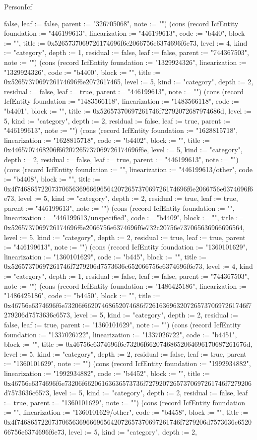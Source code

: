 \begin{lexlean}{PersonIcf}
\begin{semanticmodule}
{false, leaf := false, parent := "326705068", note := ""}) (cons (record IcfEntity {foundation := "446199613", linearization := "446199613", code := "b440", block := "", title := 0x5265737069726174696f6e2066756e6374696f6e73, level := 4, kind := "category", depth := 1, residual := false, leaf := false, parent := "744367503", note := ""}) (cons (record IcfEntity {foundation := "1329924326", linearization := "1329924326", code := "b4400", block := "", title := 0x5265737069726174696f6e2072617465, level := 5, kind := "category", depth := 2, residual := false, leaf := true, parent := "446199613", note := ""}) (cons (record IcfEntity {foundation := "1483566118", linearization := "1483566118", code := "b4401", block := "", title := 0x52657370697261746f72792072687974686d, level := 5, kind := "category", depth := 2, residual := false, leaf := true, parent := "446199613", note := ""}) (cons (record IcfEntity {foundation := "1628815718", linearization := "1628815718", code := "b4402", block := "", title := 0x4465707468206f66207265737069726174696f6e, level := 5, kind := "category", depth := 2, residual := false, leaf := true, parent := "446199613", note := ""}) (cons (record IcfEntity {foundation := "", linearization := "446199613/other", code := "b4408", block := "", title := 0x4f7468657220737065636966696564207265737069726174696f6e2066756e6374696f6e73, level := 5, kind := "category", depth := 2, residual := true, leaf := true, parent := "446199613", note := ""}) (cons (record IcfEntity {foundation := "", linearization := "446199613/unspecified", code := "b4409", block := "", title := 0x5265737069726174696f6e2066756e6374696f6e732c20756e737065636966696564, level := 5, kind := "category", depth := 2, residual := true, leaf := true, parent := "446199613", note := ""}) (cons (record IcfEntity {foundation := "1360101629", linearization := "1360101629", code := "b445", block := "", title := 0x52657370697261746f7279206d7573636c652066756e6374696f6e73, level := 4, kind := "category", depth := 1, residual := false, leaf := false, parent := "744367503", note := ""}) (cons (record IcfEntity {foundation := "1486425186", linearization := "1486425186", code := "b4450", block := "", title := 0x46756e6374696f6e73206f66207468652074686f72616369632072657370697261746f7279206d7573636c6573, level := 5, kind := "category", depth := 2, residual := false, leaf := true, parent := "1360101629", note := ""}) (cons (record IcfEntity {foundation := "1337026722", linearization := "1337026722", code := "b4451", block := "", title := 0x46756e6374696f6e73206f66207468652064696170687261676d, level := 5, kind := "category", depth := 2, residual := false, leaf := true, parent := "1360101629", note := ""}) (cons (record IcfEntity {foundation := "1992934882", linearization := "1992934882", code := "b4452", block := "", title := 0x46756e6374696f6e73206f66206163636573736f72792072657370697261746f7279206d7573636c6573, level := 5, kind := "category", depth := 2, residual := false, leaf := true, parent := "1360101629", note := ""}) (cons (record IcfEntity {foundation := "", linearization := "1360101629/other", code := "b4458", block := "", title := 0x4f74686572207370656369666965642072657370697261746f7279206d7573636c652066756e6374696f6e73, level := 5, kind := "category", depth := 2, }
\end{semanticmodule}
\end{lexlean}
